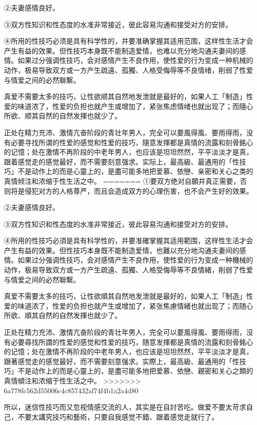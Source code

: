 \documentclass[12pt,UTF8]{ctexbook}
\begin{document}
②夫妻感情良好。

③双方性知识和性态度的水准非常接近，彼此容易沟通和接受对方的安排。

④所用的性技巧必须是具有科学性的，并要准确掌握其适用范围，这样性生活才会产生有益的效果。但性技巧本身既不能制造爱情，也难以充分地沟通夫妻间的感情。如果过分强调性技巧，会对感情产生不良作用，使性爱的行为变成一种机械的动作，极易导致双方或一方产生疏遠、孤獨、人格受侮辱等不良情绪，削弱了性爱与情爱之间的必然聯繫。

真爱不需要太多的技巧，让性欲顺其自然地发泄就是最好的，如果人工「制造」性爱的味道浓了，性爱的负担也就产生或增加了，紧张焦虑情绪也就出现了；而隨心所欲、顺其自然的自然发揮也就少了。

正处在精力充沛、激情亢奋阶段的青壮年男人，完全可以要風得風、要雨得雨，没有必要寻找所谓的性爱的感觉和性爱的技巧，隨意发揮都是真情的流露和刻骨銘心的记憶；处在激情不再阶段的中老年男人，也应该是坦坦然然，平平淡淡才是真，跟着感觉走的感觉最好，而不需要刻意强求。实际上，最高級、最通用的「性技巧」不是动作上的而是心靈上的，是盡可能多地把爱慕、依戀、亲密和关心之类的真情倾注和浓缩于性生活之中。
=======
①要双方绝对自願并真正需要，否则将是侵犯对方的人格尊严，而且会造成双方的心理伤害，也不会产生好的效果。

②夫妻感情良好。

③双方性知识和性态度的水准非常接近，彼此容易沟通和接受对方的安排。

④所用的性技巧必須是具有科学性的，并要准確掌握其适用範围，这样性生活才会产生有益的效果。但性技巧本身既不能制造爱情，也難以充分地沟通夫妻间的感情。如果过分强调性技巧，会对感情产生不良作用，使性爱的行为变成一种機械的动作，极易导致双方或一方产生疏遠、孤獨、人格受侮辱等不良情緒，削弱了性爱与情爱之间的必然聯繫。

真爱不需要太多的技巧，让性欲順其自然地发泄就是最好的，如果人工「制造」性爱的味道浓了，性爱的负担也就产生或增加了，紧张焦慮情緒也就出现了；而随心所欲、順其自然的自然发揮也就少了。

正处在精力充沛、激情亢奋阶段的青壮年男人，完全可以要風得風、要雨得雨，沒有必要尋找所謂的性爱的感觉和性爱的技巧，随意发揮都是真情的流露和刻骨銘心的记憶；处在激情不再阶段的中老年男人，也应该是坦坦然然，平平淡淡才是真，跟著感觉走的感觉最好，而不需要刻意强求。实際上，最高級、最通用的「性技巧」不是动作上的而是心靈上的，是盡可能多地把爱慕、依戀、親密和关心之類的真情傾注和浓缩于性生活之中。
>>>>>>> 6a778fc562d55006c4c857432af74f4b1a2a4d80

所以，迷信性技巧而又忽视情感交流的人，其实是在自討苦吃。做爱不要太苛求自己，不要太講究技巧和藝術，只要自我感觉不錯、跟着感觉走就行了。
\end{document}
